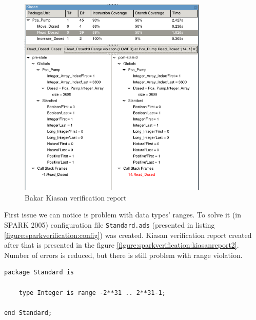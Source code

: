 \begin{figure}[ht]%
    \begin{center}
        \includegraphics[width=0.8\textwidth]{figures/pca-pump-verification-step1.png}        
    \end{center}    
    \caption{Bakar Kiasan verification report}
    \label{figure:sparkverification:kiasanreport1}
\end{figure}

First issue we can notice is problem with data types' ranges. To solve it (in SPARK 2005) configuration file \lstinline{Standard.ads} (presented in listing \ref{figure:sparkverification:config}) was created. Kiasan verification report created after that is presented in the figure \ref{figure:sparkverification:kiasanreport2}. Number of errors is reduced, but there is still problem with range violation.

\singlespacing
\begin{lstlisting}[frame=single, gobble=0, caption={Configuration file for Bakar Kiasan}, label={figure:sparkverification:config}]
package Standard is

    type Integer is range -2**31 .. 2**31-1;

end Standard;
\end{lstlisting}
\doublespacing

